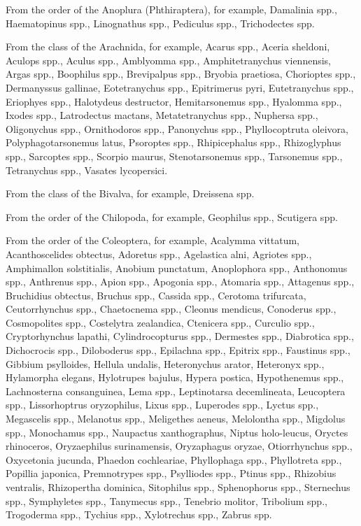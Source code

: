 \documentclass[11pt,a4paper]{article}
\begin{document}
From the order of the Anoplura (Phthiraptera), for example, Damalinia spp., Haematopinus spp., Linognathus spp., Pediculus spp., Trichodectes spp.

From the class of the Arachnida, for example, Acarus spp., Aceria sheldoni, Aculops spp., Aculus spp., Amblyomma spp., Amphitetranychus viennensis, Argas spp., Boophilus spp., Brevipalpus spp., Bryobia praetiosa, Chorioptes spp., Dermanyssus gallinae, Eotetranychus spp., Epitrimerus pyri, Eutetranychus spp., Eriophyes spp., Halotydeus destructor, Hemitarsonemus spp., Hyalomma spp., Ixodes spp., Latrodectus mactans, Metatetranychus spp., Nuphersa spp., Oligonychus spp., Ornithodoros spp., Panonychus spp., Phyllocoptruta oleivora, Polyphagotarsonemus latus, Psoroptes spp., Rhipicephalus spp., Rhizoglyphus spp., Sarcoptes spp., Scorpio maurus, Stenotarsonemus spp., Tarsonemus spp., Tetranychus spp., Vasates lycopersici.

From the class of the Bivalva, for example, Dreissena spp.

From the order of the Chilopoda, for example, Geophilus spp., Scutigera spp.

From the order of the Coleoptera, for example, Acalymma vittatum, Acanthoscelides obtectus, Adoretus spp., Agelastica alni, Agriotes spp., Amphimallon solstitialis, Anobium punctatum, Anoplophora spp., Anthonomus spp., Anthrenus spp., Apion spp., Apogonia spp., Atomaria spp., Attagenus spp., Bruchidius obtectus, Bruchus spp., Cassida spp., Cerotoma trifurcata, Ceutorrhynchus spp., Chaetocnema spp., Cleonus mendicus, Conoderus spp., Cosmopolites spp., Costelytra zealandica, Ctenicera spp., Curculio spp., Cryptorhynchus lapathi, Cylindrocopturus spp., Dermestes spp., Diabrotica spp., Dichocrocis spp., Diloboderus spp., Epilachna spp., Epitrix spp., Faustinus spp., Gibbium psylloides, Hellula undalis, Heteronychus arator, Heteronyx spp., Hylamorpha elegans, Hylotrupes bajulus, Hypera postica, Hypothenemus spp., Lachnosterna consanguinea, Lema spp., Leptinotarsa decemlineata, Leucoptera spp., Lissorhoptrus oryzophilus, Lixus spp., Luperodes spp., Lyctus spp., Megascelis spp., Melanotus spp., Meligethes aeneus, Melolontha spp., Migdolus spp., Monochamus spp., Naupactus xanthographus, Niptus holo-leucus, Oryctes rhinoceros, Oryzaephilus surinamensis, Oryzaphagus oryzae, Otiorrhynchus spp., Oxycetonia jucunda, Phaedon cochleariae, Phyllophaga spp., Phyllotreta spp., Popillia japonica, Premnotrypes spp., Psylliodes spp., Ptinus spp., Rhizobius ventralis, Rhizopertha dominica, Sitophilus spp., Sphenophorus spp., Sternechus spp., Symphyletes spp., Tanymecus spp., Tenebrio molitor, Tribolium spp., Trogoderma spp., Tychius spp., Xylotrechus spp., Zabrus spp.
\end{document}
